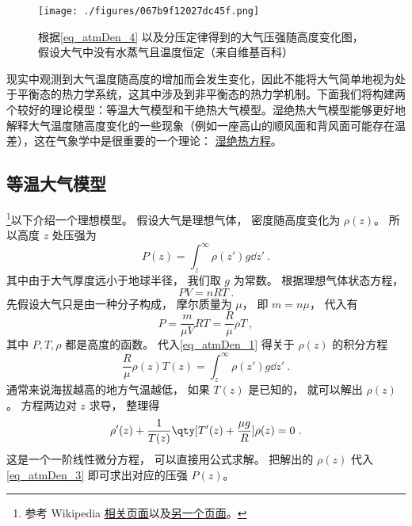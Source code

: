 

\begin{figure}[ht]
\centering
\texttt{[image: ./figures/067b9f12027dc45f.png]}
\caption{根据\autoref{eq_atmDen_4}  以及分压定律得到的大气压强随高度变化图， 假设大气中没有水蒸气且温度恒定（来自维基百科）}\label{fig_atmDen_1}
\end{figure}
现实中观测到大气温度随高度的增加而会发生变化，因此不能将大气简单地视为处于平衡态的热力学系统，这其中涉及到非平衡态的热力学机制。下面我们将构建两个较好的理论模型：等温大气模型和干绝热大气模型。湿绝热大气模型能够更好地解释大气温度随高度变化的一些现象（例如一座高山的顺风面和背风面可能存在温差），这在气象学中是很重要的一个理论：
\href{https://t-inp.readthedocs.io/zh_CN/latest/\%E7\%83\%AD\%E5\%8A\%9B\%E5\%AD\%A6\%E5\%9F\%BA\%E7\%A1\%80.html}{湿绝热方程}。

\subsection{等温大气模型}
\footnote{参考 Wikipedia \href{https://en.wikipedia.org/wiki/Atmospheric_pressure}{相关页面}以及\href{https://en.wikipedia.org/wiki/International_Standard_Atmosphere}{另一个页面}。}以下介绍一个理想模型。 假设大气是理想气体， 密度随高度变化为 $\rho(z)$。 所以高度 $z$ 处压强为
\begin{equation}\label{eq_atmDen_1}
P(z) = \int_{z}^\infty \rho(z') g \dd{z'}~.
\end{equation}
其中由于大气厚度远小于地球半径， 我们取 $g$ 为常数。 根据理想气体状态方程，
\begin{equation}
PV = n R T~.
\end{equation}
先假设大气只是由一种分子构成， 摩尔质量为 $\mu$， 即 $m = n\mu$， 代入有
\begin{equation}\label{eq_atmDen_3}
P = \frac{m}{\mu V} RT = \frac{R}{\mu} \rho T~,
\end{equation}
其中 $P, T, \rho$ 都是高度的函数。 代入\autoref{eq_atmDen_1} 得关于 $\rho(z)$ 的积分方程
\begin{equation}
\frac{R}{\mu} \rho(z) T(z) = \int_{z}^\infty \rho(z') g \dd{z'}~.
\end{equation}
通常来说海拔越高的地方气温越低， 如果 $T(z)$ 是已知的， 就可以解出 $\rho(z)$。 方程两边对 $z$ 求导， 整理得
\begin{equation}\label{eq_atmDen_5}
\rho'(z)  +  \frac{1}{T(z)}\qty[T'(z) + \frac{\mu g}{R}]\rho(z) = 0~.
\end{equation}
这是一个一阶线性微分方程， 可以直接用公式求解。 把解出的 $\rho(z)$ 代入\autoref{eq_atmDen_3} 即可求出对应的压强 $P(z)$。

